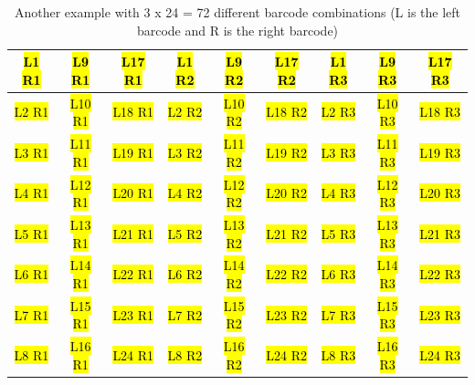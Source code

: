 \documentclass[11pt, oneside]{article}
\newcommand{\hlc}[2][yellow]{ {\sethlcolor{#1} \hl{#2}} }
\begin{document}
	\begin{table}[h]
					\caption[ddRAD example table]{Another example with 3 x 24 = 72 different barcode combinations (L is the left barcode and R is the right barcode)}
				\centering
				\begin{tabular}{ | c | c | c | c | c | c | c | c | c | }
				\hline
				\hl{L1 R1} & \hl{L9 R1} & \hl{L17 R1} & \hlc[green]{L1 R2} & \hlc[green]{L9 R2} & \hlc[green]{L17 R2} & \hlc[cyan]{L1 R3} & \hlc[cyan]{L9 				R3} & \hlc[cyan]{L17 R3} \\ \hline
				\hl{L2 R1} & \hl{L10 R1} & \hl{L18 R1} & \hlc[green]{L2 R2} & \hlc[green]{L10 R2} & \hlc[green]{L18 R2} & \hlc[cyan]{L2 R3} & \hlc[cyan]				{L10 R3} & \hlc[cyan]{L18 R3} \\ \hline
				\hl{L3 R1} & \hl{L11 R1} & \hl{L19 R1} & \hlc[green]{L3 R2} & \hlc[green]{L11 R2} & \hlc[green]{L19 R2} & \hlc[cyan]{L3 R3} & \hlc[cyan]				{L11 R3} & \hlc[cyan]{L19 R3} \\ \hline
				\hl{L4 R1} & \hl{L12 R1} & \hl{L20 R1} & \hlc[green]{L4 R2} & \hlc[green]{L12 R2} & \hlc[green]{L20 R2} & \hlc[cyan]{L4 R3} & \hlc[cyan]				{L12 R3} & \hlc[cyan]{L20 R3} \\ \hline
				\hl{L5 R1} & \hl{L13 R1} & \hl{L21 R1} & \hlc[green]{L5 R2} & \hlc[green]{L13 R2} & \hlc[green]{L21 R2} & \hlc[cyan]{L5 R3} & \hlc[cyan]				{L13 R3} & \hlc[cyan]{L21 R3} \\ \hline
				\hl{L6 R1} & \hl{L14 R1} & \hl{L22 R1} & \hlc[green]{L6 R2} & \hlc[green]{L14 R2} & \hlc[green]{L22 R2} & \hlc[cyan]{L6 R3} & \hlc[cyan]				{L14 R3} & \hlc[cyan]{L22 R3} \\ \hline
				\hl{L7 R1} & \hl{L15 R1} & \hl{L23 R1} & \hlc[green]{L7 R2} & \hlc[green]{L15 R2} & \hlc[green]{L23 R2} & \hlc[cyan]{L7 R3} & \hlc[cyan]				{L15 R3} & \hlc[cyan]{L23 R3} \\ \hline
				\hl{L8 R1} & \hl{L16 R1} & \hl{L24 R1} & \hlc[green]{L8 R2} & \hlc[green]{L16 R2} & \hlc[green]{L24 R2} & \hlc[cyan]{L8 R3} & \hlc[cyan]				{L16 R3} & \hlc[cyan]{L24 R3} \\ \hline
				\end{tabular}
	\end{table}
\end{document}
